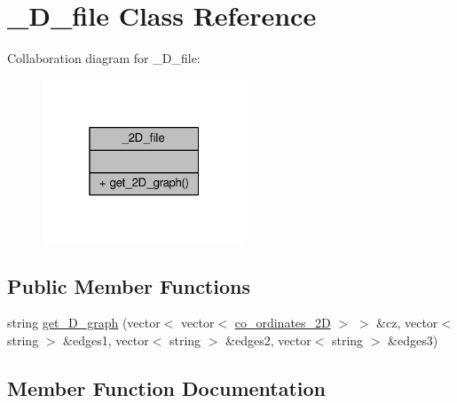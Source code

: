 \hypertarget{class__2D__file}{}\section{\+\_\+D\+\_\+file Class Reference}
\label{class__2D__file}


Collaboration diagram for \+\_\+D\+\_\+file\+:
\nopagebreak
\begin{figure}[H]
\begin{center}
\leavevmode
\includegraphics[width=172pt]{class__2D__file__coll__graph}
\end{center}
\end{figure}
\subsection*{Public Member Functions}
\begin{DoxyCompactItemize}
\item 
string \hyperlink{class__2D__file_a7486d81910550512d489c42e02d853b3}{get\+\_\+D\+\_\+graph} (vector$<$ vector$<$ \hyperlink{structco__ordinates__2D}{co\+\_\+ordinates\+\_\+2D} $>$ $>$ \&cz, vector$<$ string $>$ \&edges1, vector$<$ string $>$ \&edges2, vector$<$ string $>$ \&edges3)
\end{DoxyCompactItemize}


\subsection{Member Function Documentation}
